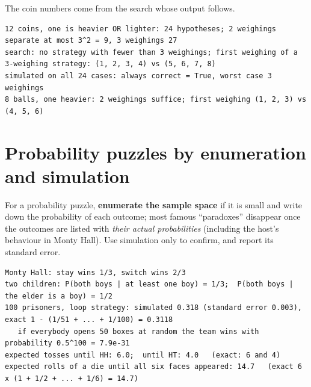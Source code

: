 \documentclass[10pt,a4paper,openany,oneside]{report}
\newcommand{\prio}[1]{\texorpdfstring{\ifcase#1\or{\color{gold}\ding{72}}\or{\color{gold}\ding{72}\ding{72}}\or{\color{gold}\ding{72}\ding{72}\ding{72}}\fi}{}}
\begin{document}
The coin numbers come from the search whose output follows.
\begin{lstlisting}[style=out,basicstyle=\ttfamily\fontsize{7.2}{8.6}\selectfont,title={ap\_coins.py: output}]
12 coins, one is heavier OR lighter: 24 hypotheses; 2 weighings separate at most 3^2 = 9, 3 weighings 27
search: no strategy with fewer than 3 weighings; first weighing of a 3-weighing strategy: (1, 2, 3, 4) vs (5, 6, 7, 8)
simulated on all 24 cases: always correct = True, worst case 3 weighings
8 balls, one heavier: 2 weighings suffice; first weighing (1, 2, 3) vs (4, 5, 6)
\end{lstlisting}
\section{Probability puzzles by enumeration and simulation \prio{2}}
For a probability puzzle, \textbf{enumerate the sample space} if it is small and write down the probability of each outcome; most famous ``paradoxes'' disappear once the outcomes are listed with \emph{their actual probabilities} (including the host's behaviour in Monty Hall). Use simulation only to confirm, and report its standard error.
\begin{lstlisting}[style=out,basicstyle=\ttfamily\fontsize{7.2}{8.6}\selectfont,title={ap\_prob.py: output}]
Monty Hall: stay wins 1/3, switch wins 2/3
two children: P(both boys | at least one boy) = 1/3;  P(both boys | the elder is a boy) = 1/2
100 prisoners, loop strategy: simulated 0.318 (standard error 0.003), exact 1 - (1/51 + ... + 1/100) = 0.3118
   if everybody opens 50 boxes at random the team wins with probability 0.5^100 = 7.9e-31
expected tosses until HH: 6.0;  until HT: 4.0   (exact: 6 and 4)
expected rolls of a die until all six faces appeared: 14.7   (exact 6 x (1 + 1/2 + ... + 1/6) = 14.7)
\end{lstlisting}
\end{document}
